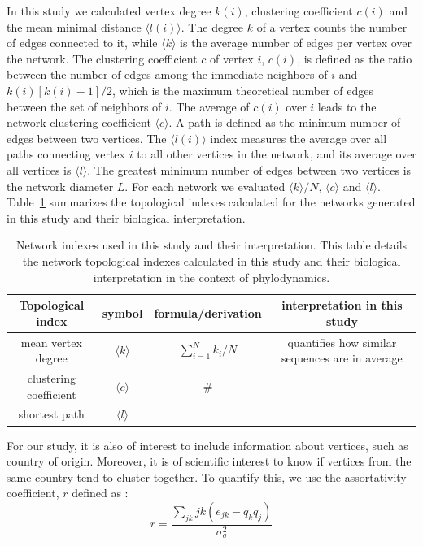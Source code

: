 \documentclass[12pt]{article}
\begin{document}
In this study we calculated vertex degree $k(i)$, clustering coefficient $c(i)$ and the mean minimal distance $\langle l(i)\rangle$.
The degree $k$ of a vertex counts the number of edges connected to it, while $\langle k \rangle$ is the average number of edges per vertex over the network.
The clustering coefficient $c$ of vertex $i$, $c(i)$, is defined as the ratio between the number of edges among the immediate neighbors of $i$ and $k(i)[k(i) -1]/2$, which is the maximum theoretical number of edges between the set of neighbors of $i$.
The average of $c(i)$ over $i$ leads to the network clustering coefficient $\langle c \rangle$.
A path is defined as the minimum number of edges between two vertices.
The $\langle l(i)\rangle$ index measures the average over all paths connecting vertex $i$ to all other vertices in the network, and its average over all vertices is  $\langle l \rangle$.
The greatest minimum number of edges between two vertices is the network diameter $L$.
For each network we evaluated $\langle k \rangle/N$, $\langle c \rangle$ and $\langle l \rangle$.
Table~\ref{tab:concepts} summarizes the topological indexes calculated for the networks generated in this study and their biological interpretation.
\begin{table}
\caption{\footnotesize Network indexes used in this study and their interpretation.
This table details the network topological indexes calculated in this study and their biological interpretation in the context of phylodynamics.}
 \begin{center}
  \begin{tabular}{cccc}
\toprule
Topological index & symbol & formula/derivation & interpretation in this study \\
 \midrule
 mean vertex degree     & $\langle k \rangle$  &$\sum_{i=1}^{N}k_i/N$ & quantifies how similar sequences are in average \\
 clustering coefficient& $\langle c \rangle$  &\#                     &\\
 shortest path         & $\langle l \rangle$  &                    &\\
 \bottomrule
  \end{tabular}
 \end{center}
 \label{tab:concepts}
\end{table}

For our study, it is also of interest to  include information about vertices, such as country of origin. Moreover, it is of scientific interest to know if vertices from the same country tend to cluster together. To quantify this, we use the assortativity coefficient, $r$ \cite{mixing} defined as :
\begin{equation}
 \label{eq:assort}
r = \frac{\sum_{jk} jk(e_{jk}-q_kq_j)}{\sigma_{q}^{2}} 
\end{equation}
\end{document}
